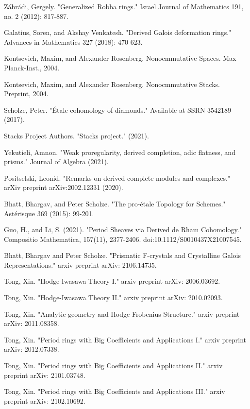 \documentclass[11pt]{report}
\begin{document}
\begin{thebibliography}{1}
 Z\'abr\'adi, Gergely. "Generalized Robba rings." Israel Journal of Mathematics 191, no. 2 (2012): 817-887.


 Galatius, Soren, and Akshay Venkatesh. "Derived Galois deformation rings." Advances in Mathematics 327 (2018): 470-623.


 Kontsevich, Maxim, and Alexander Rosenberg. Nonocmmutative Spaces. Max-Planck-Inst., 2004.
	
 Kontsevich, Maxim, and Alexander Rosenberg. Nonocmmutative Stacks. Preprint, 2004.

 Scholze, Peter. "\'Etale cohomology of diamonds." Available at SSRN 3542189 (2017).

 Stacks Project Authors. "Stacks project." (2021). 
	

 Yekutieli, Amnon. "Weak proregularity, derived completion, adic flatness, and prisms." Journal of Algebra (2021).


 Positselski, Leonid. "Remarks on derived complete modules and complexes." arXiv preprint arXiv:2002.12331 (2020).


 Bhatt, Bhargav, and Peter Scholze. "The pro-\'etale Topology for Schemes." Ast\'erisque 369 (2015): 99-201.

 Guo, H., and Li, S. (2021). "Period Sheaves via Derived de Rham Cohomology." Compositio Mathematica, 157(11), 2377-2406. doi:10.1112/S0010437X21007545.

 Bhatt, Bhargav and Peter Scholze. "Prismatic F-crystals and Crystalline Galois Representations." arxiv preprint arXiv: 2106.14735.

 Tong, Xin. "Hodge-Iwasawa Theory I." arxiv preprint arXiv: 2006.03692.

 Tong, Xin. "Hodge-Iwasawa Theory II." arxiv preprint arXiv: 2010.02093.

 Tong, Xin. "Analytic geometry and Hodge-Frobenius Structure." arxiv preprint arXiv: 2011.08358.

 Tong, Xin. "Period rings with Big Coefficients and Applications I." arxiv preprint arXiv: 2012.07338. 

 Tong, Xin. "Period rings with Big Coefficients and Applications II." arxiv preprint arXiv: 2101.03748.

 Tong, Xin. "Period rings with Big Coefficients and Applications III." arxiv preprint arXiv: 2102.10692.


\end{thebibliography}
\end{document}
